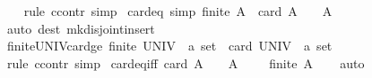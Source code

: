 \begin{isabellebody}
%
\isadelimproof
\ \ %
\endisadelimproof
%
\isatagproof
{}\isamarkupfalse%
\ {\isacharparenleft}{\kern0pt}rule\ ccontr{\isacharparenright}{\kern0pt}\ simp%
\endisatagproof
{\isafoldproof}%
%
\isadelimproof
\isanewline
%
\endisadelimproof
\isanewline
{}\isamarkupfalse%
\ card{\isacharunderscore}{\kern0pt}{}{\isacharunderscore}{\kern0pt}eq\ {\isacharbrackleft}{\kern0pt}simp{\isacharbrackright}{\kern0pt}{\isacharcolon}{\kern0pt}\ {\isachardoublequoteopen}finite\ A\ {\isasymLongrightarrow}\ card\ A\ {\isacharequal}{\kern0pt}\ {}\ {\isasymlongleftrightarrow}\ A\ {\isacharequal}{\kern0pt}\ {\isacharbraceleft}{\kern0pt}{\isacharbraceright}{\kern0pt}{\isachardoublequoteclose}\isanewline
%
\isadelimproof
\ \ %
\endisadelimproof
%
\isatagproof
{}\isamarkupfalse%
\ {\isacharparenleft}{\kern0pt}auto\ dest{\isacharcolon}{\kern0pt}\ mk{\isacharunderscore}{\kern0pt}disjoint{\isacharunderscore}{\kern0pt}insert{\isacharparenright}{\kern0pt}%
\endisatagproof
{\isafoldproof}%
%
\isadelimproof
\isanewline
%
\endisadelimproof
\isanewline
{}\isamarkupfalse%
\ finite{\isacharunderscore}{\kern0pt}UNIV{\isacharunderscore}{\kern0pt}card{\isacharunderscore}{\kern0pt}ge{\isacharunderscore}{\kern0pt}{}{\isacharcolon}{\kern0pt}\ {\isachardoublequoteopen}finite\ {\isacharparenleft}{\kern0pt}UNIV\ {\isacharcolon}{\kern0pt}{\isacharcolon}{\kern0pt}\ {\isacharprime}{\kern0pt}a\ set{\isacharparenright}{\kern0pt}\ {\isasymLongrightarrow}\ card\ {\isacharparenleft}{\kern0pt}UNIV\ {\isacharcolon}{\kern0pt}{\isacharcolon}{\kern0pt}\ {\isacharprime}{\kern0pt}a\ set{\isacharparenright}{\kern0pt}\ {\isachargreater}{\kern0pt}\ {}{\isachardoublequoteclose}\isanewline
%
\isadelimproof
\ \ %
\endisadelimproof
%
\isatagproof
{}\isamarkupfalse%
\ {\isacharparenleft}{\kern0pt}rule\ ccontr{\isacharparenright}{\kern0pt}\ simp%
\endisatagproof
{\isafoldproof}%
%
\isadelimproof
\isanewline
%
\endisadelimproof
\isanewline
{}\isamarkupfalse%
\ card{\isacharunderscore}{\kern0pt}eq{\isacharunderscore}{\kern0pt}{}{\isacharunderscore}{\kern0pt}iff{\isacharcolon}{\kern0pt}\ {\isachardoublequoteopen}card\ A\ {\isacharequal}{\kern0pt}\ {}\ {\isasymlongleftrightarrow}\ A\ {\isacharequal}{\kern0pt}\ {\isacharbraceleft}{\kern0pt}{\isacharbraceright}{\kern0pt}\ {\isasymor}\ {\isasymnot}\ finite\ A{\isachardoublequoteclose}\isanewline
%
\isadelimproof
\ \ %
\endisadelimproof
%
\isatagproof
{}\isamarkupfalse%
\ auto%
\endisatagproof
{\isafoldproof}%
%

\end{isabellebody}
